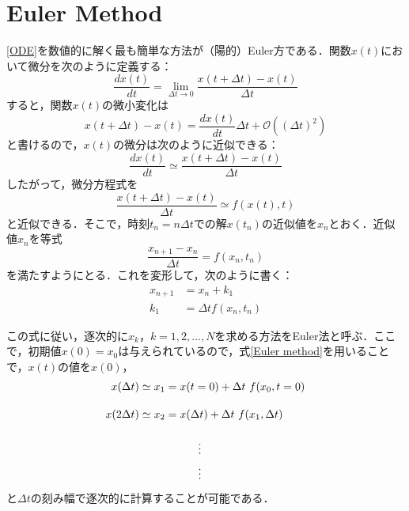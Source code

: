\section{Euler Method}
\eqref{ODE}を数値的に解く最も簡単な方法が（陽的）Euler方である．関数$x(t)$において微分を次のように定義する：
\begin{equation}
	\frac{dx(t)}{dt}=\lim_{\Delta t\to0}\frac{x(t+\Delta t)-x(t)}{\Delta t}
\end{equation}
すると，関数$x(t)$の微小変化は
\begin{equation}
	x(t+\Delta t)-x(t)=\frac{dx(t)}{dt}\Delta t+\mathcal{O}((\Delta t)^2)
\end{equation}
と書けるので，$x(t)$の微分は次のように近似できる：
\begin{equation}
	\frac{dx(t)}{dt}\simeq\frac{x(t+\Delta t)-x(t)}{\Delta t}
\end{equation}
したがって，微分方程式を
\begin{equation}
	\frac{x(t+\Delta t)-x(t)}{\Delta t}
	\simeq f(x(t),t)
\end{equation}
と近似できる．そこで，時刻$t_n=n\Delta t$での解$x(t_n)$の近似値を$x_n$とおく．近似値$x_n$を等式
\begin{equation}
	\frac{x_{n+1}-x_n}{\Delta t} = f(x_n,t_n)
\end{equation}
を満たすようにとる．これを変形して，次のように書く：
\begin{align}\label{Euler method}
	x_{n+1}&=x_n+k_1\\[10pt]
	k_1&=\Delta t f(x_n, t_n)
\end{align}

この式に従い，逐次的に$x_k$，$k = 1,2,\ldots,N$を求める方法をEuler法と呼ぶ．ここで，初期値$x(0)=x_0$は与えられているので，式\eqref{Euler method}を用いることで，$x(t)$の値を$x(0)$，
\begin{align}
	x(\Delta t)\simeq x_1&=x(t=0) +\Delta t\ f(x_0,t=0)\\[10pt]
	x(2\Delta t)\simeq x_2&=x(\Delta t) +\Delta t\ f(x_1,\Delta t)\\[10pt]
	&\hspace{30pt}\vdots\notag \\
	&\hspace{30pt}\vdots\notag
\end{align}
と$\Delta t$の刻み幅で逐次的に計算することが可能である．


